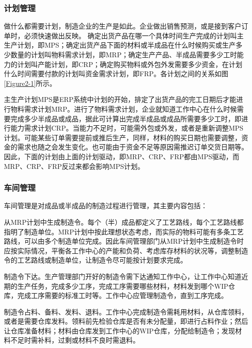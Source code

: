 \documentclass{Proposal}
\begin{document}
\subsubsection{计划管理}

做什么都需要计划，制造企业的生产是如此。企业做出销售预测，或是接到客户订单时，必须快速做出反映。
确定出货产品在哪一个具体时间生产完成的计划叫主生产计划，即MPS；确定出货产品下面的材料或半成品在什么时候购买或生产多少数量的计划叫物料需求计划，即MRP；确定生产产品、半成品需要多少工时能力的计划叫产能计划，即CRP；确定购买物料或外包外发需要多少资金，在计划什么时间需要付款的计划叫资金需求计划，即FRP。各计划之间的关系如图\ref{Figure2-1}所示。


主生产计划MPS是ERP系统中计划的开始，排定了出货产品的完工日期后才能进行物料需求计划MRP。进行了物料需求计划，企业就知道工作中心在什么时候需要完成多少半成品或成品，据此可计算出完成半成品或成品所需要多少工时，即进行能力需求计划CRP。当能力不足时，可能需外包或外发，或者是重新调整MPS计划。可能某些订单需要提前或推后生产，同样，材料的购买日期也需要调整，资金的需求也随之会发生变化。也可能由于资金不足等原因需推迟订单交货日期等。因此，下面的计划由上面的计划驱动，即MRP、CRP、FRP都由MPS驱动，而MRP、CRP、FRP反过来都会影响MPS计划。

\subsubsection{车间管理}

车间管理是对成品或半成品的制造过程进行管理，其主要内容包括：

从MRP计划中生成制造令。每个（半）成品都定义了工艺路线，每个工艺路线都指明了制造单位。MRP计划中按此理想状态考虑，而实际的物料可能有多条工艺路线，可以由多个制造单位完成。因此车间管理部门从MRP计划中生成制造令时应按实际情况，平衡各工作中心的产能和负荷、考虑库存材料的状况等，调整制造令的工艺路线或制造单位，让制造令尽可能按计划要求完成。

制造令下达。生产管理部门开好的制造令需下达通知工作中心，让工作中心知道近期的生产任务，完成多少工序，完成工序需要哪些材料，材料发到哪个WIP仓库，完成工序需要的标准工时等。工作中心应管理制造令，直到工序完成。

制造令占料、备料、发料、退料。工作中心完成制造令需耗用材料，从仓库领料，或者是需要仓库发料。领料前先检验仓库是否有未分配量，即进行占料作业；然后让仓库准备材料；材料由仓库发到工作中心的WIP仓库，分配给制造令；发现材料不足时需补料，过剩或材料不良时需退料。
\end{document}

